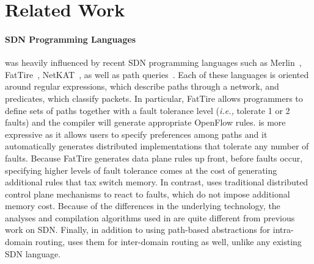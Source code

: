 \section{Related Work}
\label{sec:related}

\paragraph*{SDN Programming Languages}
\sysname{} was heavily influenced by recent SDN programming
languages such as Merlin~\cite{foster:merlin}, FatTire~\cite{fattire},
NetKAT~\cite{netkat}, as well as path queries~\cite{queries}.
Each of these languages is oriented around regular expressions, which
describe paths through a network, and predicates, which classify packets.
In particular, FatTire allows programmers to define sets of paths together
with a fault tolerance level (\emph{i.e.,} tolerate 1 or 2 faults)
and the compiler will generate appropriate
OpenFlow rules.  \sysname is more
expressive as it allows users to specify preferences among
paths and it automatically generates distributed
implementations that tolerate
any number of faults.  Because FatTire generates data plane rules up front,
before faults occur, specifying higher levels of fault tolerance comes
at the cost of generating additional rules that tax switch
memory.  In contrast, \sysname uses traditional distributed
control plane mechanisms to react to faults, which do not impose
additional memory cost.
Because of the differences in the underlying technology, the analyses
and compilation algorithms used in \sysname are quite different from
previous work on SDN.  Finally, in addition to using path-based abstractions
for intra-domain routing, \sysname uses them for inter-domain routing as
well, unlike any existing SDN language.

